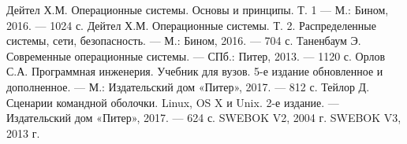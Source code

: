 \begin{thebibliography}{2}
	 Дейтел Х.М. Операционные системы. Основы и принципы. Т. 1 — М.: Бином, 2016. — 1024 с.
	 Дейтел Х.М. Операционные системы. Т. 2. Распределенные системы, сети, безопасность. — М.: Бином, 2016. — 704 с.
	 Таненбаум Э. Современные операционные системы. — СПб.: Питер, 2013. — 1120 с.
	 Орлов С.А. Программная инженерия.
		Учебник для вузов. 5-е издание обновленное и дополненное. — М.:
		Издательский дом «Питер», 2017. — 812 с.
	 Тейлор Д. Сценарии командной оболочки.
		Linux, OS X и Unix. 2-е издание.
		— Издательский дом «Питер», 2017. — 624 с.
	 SWEBOK V2, 2004 г.
	 SWEBOK V3, 2013 г.
\end{thebibliography}


